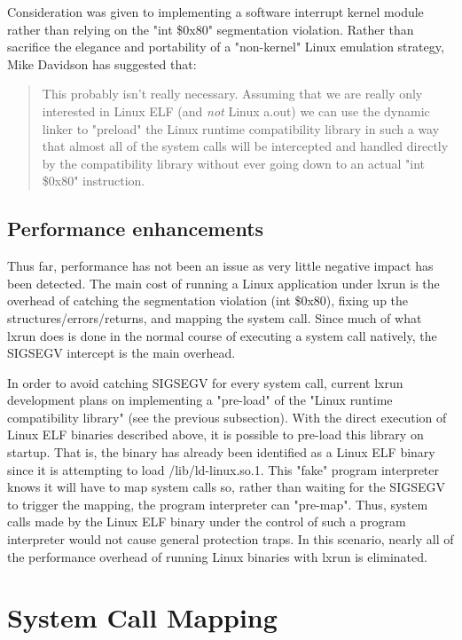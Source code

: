 \documentclass[letterpaper]{article}
\begin{document}
Consideration was given to implementing a software interrupt kernel module
rather than relying on the "int \$0x80" segmentation violation. Rather than
sacrifice the elegance and portability of a "non-kernel" Linux emulation
strategy, Mike Davidson has suggested that:
\begin{quotation}
This probably isn't really necessary. Assuming that we are really
only interested in Linux ELF (and {\itshape not\/} Linux a.out) we can use
the dynamic linker to "preload" the Linux runtime compatibility
library in such a way that almost all of the system calls will be
intercepted and handled directly by the compatibility library 
without ever going down to an actual "int \$0x80" instruction.
\end{quotation}





\subsection{Performance enhancements}

Thus far, performance has not been an issue as very little negative
impact has been detected.  The main cost of running a Linux application under
lxrun is the overhead of catching the segmentation violation (int \$0x80),
fixing up the structures/errors/returns, and mapping the system call.
Since much of what lxrun does is done in the normal course of executing a 
system call natively, the SIGSEGV intercept is the main overhead.

In order to avoid catching SIGSEGV for every system call, current lxrun
development plans on implementing a "pre-load" of the "Linux runtime 
compatibility library" (see the previous subsection). With the direct 
execution of Linux ELF binaries described above, it is possible to pre-load 
this library on startup. That is, the binary has already
been identified as a Linux ELF binary since it is attempting to load
/lib/ld-linux.so.1. This "fake" program interpreter knows it will have to
map system calls so, rather than waiting for the SIGSEGV to trigger the 
mapping, the program interpreter can "pre-map". Thus, system calls made by
the Linux ELF binary under the control of such a program interpreter would
not cause general protection traps. In this scenario, nearly all of the 
performance overhead of running Linux binaries with lxrun is eliminated.




\section{System Call Mapping}
\end{document}
